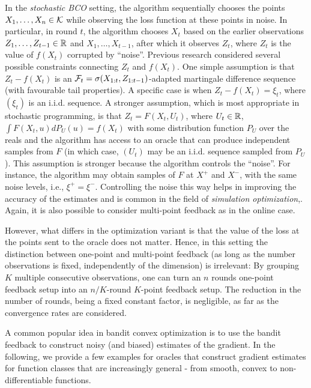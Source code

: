 In the \emph{stochastic BCO} setting,
the algorithm sequentially chooses the points $X_1,\dots,X_n\in \mathcal{K}$ while observing the loss function at these points in noise.
In particular, in round $t$, the algorithm chooses $X_t$ based on the earlier observations $Z_1,\dots,Z_{t-1}\in \mathbb{R}$ and $X_1,\dots,X_{t-1}$, after which it observes $Z_t$, where $Z_t$ is the value of $f(X_t)$ corrupted by ``noise''.
Previous research considered several possible constraints connecting $Z_t$ and $f(X_t)$.
One simple assumption is that $Z_t-f(X_t)$ is an $\mathcal{F}_t = \sigma(X_{1:t},Z_{1:t-1})$-adapted martingale difference sequence (with favourable tail properties).
A specific case is when $Z_t - f(X_t) = \xi_t$, where $(\xi_t)$ is an i.i.d. sequence.
A stronger assumption, which is most appropriate in stochastic programming,
is that $Z_t = F(X_t,U_t)$, where $U_t\in \mathbb{R}$, $\int F(X_t,u) dP_U(u) = f(X_t)$ with some distribution function $P_U$ over the reals and the algorithm has access to an oracle that can produce independent samples from $F$ (in which case, $(U_t)$ may be an i.i.d. sequence sampled from $P_U$).
This assumption is stronger because the algorithm controls the
``noise''.
For instance, the algorithm may obtain samples of $F$ at $X^+$ and $X^-$, with the same noise levels, i.e., $\xi^+=\xi^-$.
Controlling the noise this way helps in improving the accuracy of the estimates and is common in the field of \textit{simulation optimization},.
Again, it is also possible to consider multi-point feedback as in the online case.

However, what differs in the optimization variant is that the value of the loss at the points sent to the oracle does not matter.
Hence, in this setting the distinction between one-point and multi-point feedback (as long as the number observations is fixed, independently of the dimension) is irrelevant:
By grouping $K$ multiple consecutive observations, one can turn an $n$ rounds one-point feedback setup into an $n/K$-round $K$-point feedback setup. The reduction in the number of rounds, being a fixed constant factor, is negligible, as far as the convergence rates are considered.


A common popular idea in bandit convex optimization is to use the bandit feedback to construct noisy (and biased) estimates of the gradient.
In the following, we provide a few examples for oracles that construct gradient estimates for function classes that are increasingly general - from smooth, convex to non-differentiable functions.

